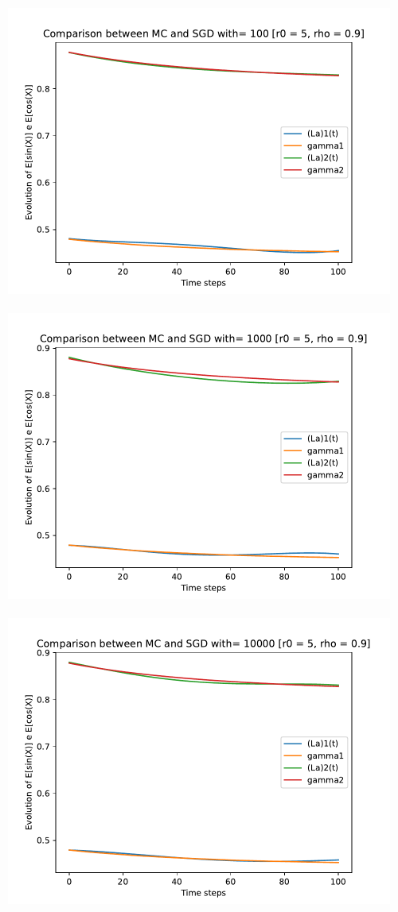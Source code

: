 \documentclass[a4paper,11pt,openright]{report}
\begin{document}
\begin{figure}[H]
\centering
\includegraphics[width=0.9\textwidth]{images/graphs T = 1/n = 4, M = 100 sine and cosine.pdf}
\end{figure}
\begin{figure}[H]
\centering
\includegraphics[width=0.9\textwidth]{images/graphs T = 1/n = 4, M = 1000 sine and cosine.pdf}
\end{figure}
\begin{figure}[H]
\centering
\includegraphics[width=0.9\textwidth]{images/graphs T = 1/n = 4, M = 10000 sine and cosine.pdf}
\end{figure}
\newpage
\end{document}
